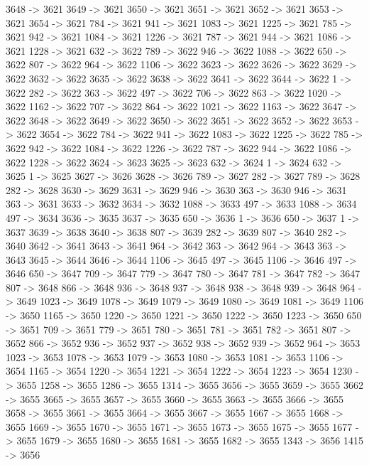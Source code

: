 {	3648 -> 3621
	3649 -> 3621
	3650 -> 3621
	3651 -> 3621
	3652 -> 3621
	3653 -> 3621
	3654 -> 3621
	784 -> 3621
	941 -> 3621
	1083 -> 3621
	1225 -> 3621
	785 -> 3621
	942 -> 3621
	1084 -> 3621
	1226 -> 3621
	787 -> 3621
	944 -> 3621
	1086 -> 3621
	1228 -> 3621
	632 -> 3622
	789 -> 3622
	946 -> 3622
	1088 -> 3622
	650 -> 3622
	807 -> 3622
	964 -> 3622
	1106 -> 3622
	3623 -> 3622
	3626 -> 3622
	3629 -> 3622
	3632 -> 3622
	3635 -> 3622
	3638 -> 3622
	3641 -> 3622
	3644 -> 3622
	1 -> 3622
	282 -> 3622
	363 -> 3622
	497 -> 3622
	706 -> 3622
	863 -> 3622
	1020 -> 3622
	1162 -> 3622
	707 -> 3622
	864 -> 3622
	1021 -> 3622
	1163 -> 3622
	3647 -> 3622
	3648 -> 3622
	3649 -> 3622
	3650 -> 3622
	3651 -> 3622
	3652 -> 3622
	3653 -> 3622
	3654 -> 3622
	784 -> 3622
	941 -> 3622
	1083 -> 3622
	1225 -> 3622
	785 -> 3622
	942 -> 3622
	1084 -> 3622
	1226 -> 3622
	787 -> 3622
	944 -> 3622
	1086 -> 3622
	1228 -> 3622
	3624 -> 3623
	3625 -> 3623
	632 -> 3624
	1 -> 3624
	632 -> 3625
	1 -> 3625
	3627 -> 3626
	3628 -> 3626
	789 -> 3627
	282 -> 3627
	789 -> 3628
	282 -> 3628
	3630 -> 3629
	3631 -> 3629
	946 -> 3630
	363 -> 3630
	946 -> 3631
	363 -> 3631
	3633 -> 3632
	3634 -> 3632
	1088 -> 3633
	497 -> 3633
	1088 -> 3634
	497 -> 3634
	3636 -> 3635
	3637 -> 3635
	650 -> 3636
	1 -> 3636
	650 -> 3637
	1 -> 3637
	3639 -> 3638
	3640 -> 3638
	807 -> 3639
	282 -> 3639
	807 -> 3640
	282 -> 3640
	3642 -> 3641
	3643 -> 3641
	964 -> 3642
	363 -> 3642
	964 -> 3643
	363 -> 3643
	3645 -> 3644
	3646 -> 3644
	1106 -> 3645
	497 -> 3645
	1106 -> 3646
	497 -> 3646
	650 -> 3647
	709 -> 3647
	779 -> 3647
	780 -> 3647
	781 -> 3647
	782 -> 3647
	807 -> 3648
	866 -> 3648
	936 -> 3648
	937 -> 3648
	938 -> 3648
	939 -> 3648
	964 -> 3649
	1023 -> 3649
	1078 -> 3649
	1079 -> 3649
	1080 -> 3649
	1081 -> 3649
	1106 -> 3650
	1165 -> 3650
	1220 -> 3650
	1221 -> 3650
	1222 -> 3650
	1223 -> 3650
	650 -> 3651
	709 -> 3651
	779 -> 3651
	780 -> 3651
	781 -> 3651
	782 -> 3651
	807 -> 3652
	866 -> 3652
	936 -> 3652
	937 -> 3652
	938 -> 3652
	939 -> 3652
	964 -> 3653
	1023 -> 3653
	1078 -> 3653
	1079 -> 3653
	1080 -> 3653
	1081 -> 3653
	1106 -> 3654
	1165 -> 3654
	1220 -> 3654
	1221 -> 3654
	1222 -> 3654
	1223 -> 3654
	1230 -> 3655
	1258 -> 3655
	1286 -> 3655
	1314 -> 3655
	3656 -> 3655
	3659 -> 3655
	3662 -> 3655
	3665 -> 3655
	3657 -> 3655
	3660 -> 3655
	3663 -> 3655
	3666 -> 3655
	3658 -> 3655
	3661 -> 3655
	3664 -> 3655
	3667 -> 3655
	1667 -> 3655
	1668 -> 3655
	1669 -> 3655
	1670 -> 3655
	1671 -> 3655
	1673 -> 3655
	1675 -> 3655
	1677 -> 3655
	1679 -> 3655
	1680 -> 3655
	1681 -> 3655
	1682 -> 3655
	1343 -> 3656
	1415 -> 3656
}
